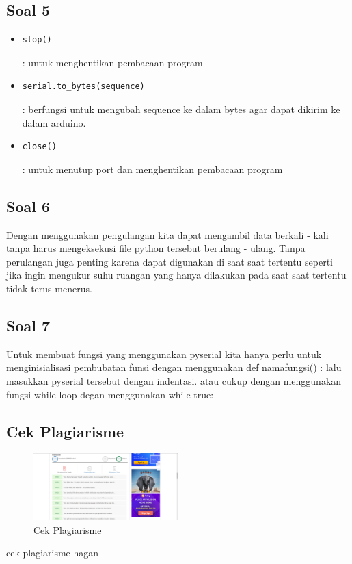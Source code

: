 	\subsection{Soal 5}
		\begin{itemize}
			\item \begin{verbatim}stop()\end{verbatim} : untuk menghentikan pembacaan program
			\item \begin{verbatim}serial.to_bytes(sequence)\end{verbatim} : berfungsi untuk mengubah sequence ke dalam bytes agar dapat dikirim ke dalam arduino.
			\item \begin{verbatim}close()\end{verbatim} : untuk menutup port dan menghentikan pembacaan program
		\end{itemize}

	\subsection{Soal 6}
	Dengan menggunakan pengulangan kita dapat mengambil data berkali - kali tanpa harus mengeksekusi file python tersebut berulang - ulang. Tanpa perulangan juga penting karena dapat digunakan di saat saat tertentu seperti jika ingin mengukur suhu ruangan yang hanya dilakukan pada saat saat tertentu tidak terus menerus.

	\subsection{Soal 7}
	Untuk membuat fungsi yang menggunakan pyserial kita hanya perlu untuk menginisialisasi pembubatan funsi dengan menggunakan def namafungsi() : lalu masukkan pyserial tersebut dengan indentasi. atau cukup dengan menggunakan fungsi while loop degan menggunakan while true:

	\subsection{Cek Plagiarisme}

	\begin{figure}
	[ht]
            \centerline{\includegraphics[width=0.5\textwidth]{figures/5/1174040/Teori/1174040_plagiat.png}}
            \caption{Cek Plagiarisme}
            \label{1174040_plagiat5}
            \end{figure}
    cek plagiarisme hagan
	

